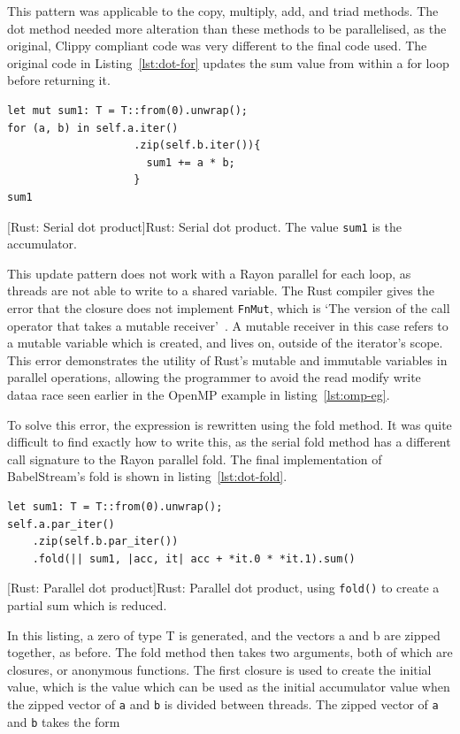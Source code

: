 This pattern was applicable to the copy, multiply, add, and triad methods. The dot method needed more alteration than these methods to be parallelised, as the original, Clippy compliant code was very different to the final code used. The original code in Listing~\ref{lst:dot-for} updates the sum value from within a for loop before returning it.
\begin{code}
\begin{verbatim}
let mut sum1: T = T::from(0).unwrap();
for (a, b) in self.a.iter()
                    .zip(self.b.iter()){
                      sum1 += a * b;
                    }
sum1
\end{verbatim}
[Rust: Serial dot product]{Rust: Serial dot product. The value \texttt{sum1} is the accumulator.}
\label{lst:dot-for}
\end{code}
This update pattern does not work with a Rayon parallel for each loop, as threads are not able to write to a shared variable. The Rust compiler gives the error that the closure does not implement \texttt{FnMut}, which is `The version of the call operator that takes a mutable receiver'~\cite{rust-doc-fnmut}. A mutable receiver in this case refers to a mutable variable which is created, and lives on, outside of the iterator's scope. This error demonstrates the utility of Rust's mutable and immutable variables in parallel operations, allowing the programmer to avoid the read modify write dataa race seen earlier in the OpenMP example in listing~\ref{lst:omp-eg}.

To solve this error, the expression is rewritten using the fold method. It was quite difficult to find exactly how to write this, as the serial fold method has a different call signature to the Rayon parallel fold. The final implementation of BabelStream's fold is shown in listing~\ref{lst:dot-fold}.
\begin{code}
\begin{verbatim}
let sum1: T = T::from(0).unwrap();
self.a.par_iter()
    .zip(self.b.par_iter())
    .fold(|| sum1, |acc, it| acc + *it.0 * *it.1).sum()
\end{verbatim}
[Rust: Parallel dot product]{Rust: Parallel dot product, using \texttt{fold()} to create a partial sum which is reduced.}
\label{lst:dot-fold}
\end{code}
In this listing, a zero of type T is generated, and the vectors a and b are zipped together, as before. The fold method then takes two arguments, both of which are closures, or anonymous functions. The first closure is used to create the initial value, which is the value which can be used as the initial accumulator value when the zipped vector of \texttt{a} and \texttt{b} is divided between threads. The zipped vector of \texttt{a} and \texttt{b} takes the form

